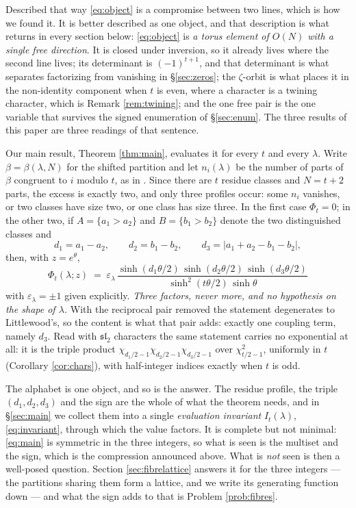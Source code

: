 \documentclass[11pt,reqno]{amsart}
\theoremstyle{plain}
\theoremstyle{definition}
\begin{document}
Described that way \eqref{eq:object} is a compromise between two lines, which is how we found it. It
is better described as one object, and that description is what returns in every section below:
\eqref{eq:object} is \emph{a torus element of $O(N)$ with a single free direction}. It is closed
under inversion, so it already lives where the second line lives; its determinant is $(-1)^{t+1}$,
and that determinant is what separates factorizing from vanishing in \S\ref{sec:zeros}; the
$\zeta$-orbit is what places it in the non-identity component when $t$ is even, where a character is
a twining character, which is Remark \ref{rem:twining}; and the one free pair is the one variable
that survives the signed enumeration of \S\ref{sec:enum}. The three results of this paper are three
readings of that sentence.

Our main result, Theorem \ref{thm:main}, evaluates it for
every $t$ and every $\lambda$. Write $\beta=\beta(\lambda,N)$ for the shifted partition and let
$n_i(\lambda)$ be the number of parts of $\beta$ congruent to $i$ modulo $t$, as in \cite{AK22}. Since
there are $t$ residue classes and $N=t+2$ parts, the excess is exactly two, and only three profiles
occur: some $n_i$ vanishes, or two classes have size two, or one class has size three. In the first
case $\Phi_t=0$; in the other two, if $A=\{a_1>a_2\}$ and $B=\{b_1>b_2\}$ denote the two
distinguished classes and
\[
d_1=a_1-a_2,\qquad d_2=b_1-b_2,\qquad d_3=|a_1+a_2-b_1-b_2|,
\]
then, with $z=e^{\theta}$,
\[
\boxed{\;\;\Phi_t(\lambda;z)\;=\;\varepsilon_\lambda\,
\frac{\sinh(d_1\theta/2)\,\sinh(d_2\theta/2)\,\sinh(d_3\theta/2)}
{\sinh^2(t\theta/2)\,\sinh\theta}\;\;}
\]
with $\varepsilon_\lambda=\pm1$ given explicitly. \emph{Three factors, never more, and no hypothesis
on the shape of $\lambda$.} With the reciprocal pair removed the statement degenerates to
Littlewood's, so the content is what that pair adds: exactly one coupling term, namely $d_3$. Read
with $\mathfrak{sl}_2$ characters the same statement carries no exponential at all: it is the triple
product $\chi_{d_1/2-1}\chi_{d_2/2-1}\chi_{d_3/2-1}$ over $\chi_{t/2-1}^2$, uniformly in $t$
(Corollary \ref{cor:chars}), with half-integer indices exactly when $t$ is odd.

The alphabet is one object, and so is the answer. The residue profile, the triple $(d_1,d_2,d_3)$ and
the sign are the whole of what the theorem needs, and in \S\ref{sec:main} we collect them into a
single \emph{evaluation invariant} $I_t(\lambda)$, \eqref{eq:invariant}, through which the value factors.
It is complete but not minimal: \eqref{eq:main} is symmetric in the three integers, so what is seen
is the multiset and the sign, which is the compression announced above. What is \emph{not} seen is
then a well-posed question. Section \ref{sec:fibrelattice} answers it for the three integers ---
the partitions sharing them form a lattice, and we write its generating function down --- and what
the sign adds to that is Problem \ref{prob:fibres}.
\end{document}
